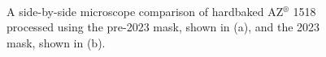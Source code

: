 \documentclass[
  a4paper,
]{scrbook}
\begin{document}
\begin{figure}
\begin{minipage}[t]{0.01\linewidth}
{\centering 

~

}

\end{minipage}%
%
\begin{minipage}[t]{0.03\linewidth}

{\centering 


}

\end{minipage}%
%
\begin{minipage}[t]{0.01\linewidth}

{\centering 

~

}

\end{minipage}%
%
\begin{minipage}[t]{0.45\linewidth}

{\centering 


}

\end{minipage}%
%
\begin{minipage}[t]{0.01\linewidth}

{\centering 

~

}

\end{minipage}%

\caption{\label{fig-microscope-encapsulation}A side-by-side microscope
comparison of hardbaked AZ\(^\circledR\) 1518 processed using the
pre-2023 mask, shown in (a), and the 2023 mask, shown in (b).}

\end{figure}
\end{document}
